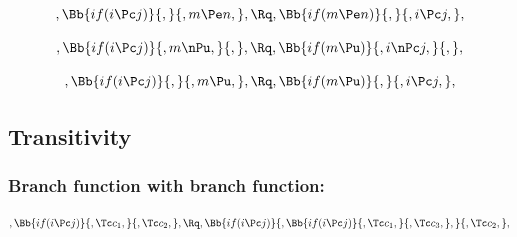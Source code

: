 \bigskip
\bigskip
\[, \Bb{if(i \Pc j)}{,}{,m \Pe n,}, \Rq , \Bb{if(m \Pe n)}{,}{,i \Pc j,},\]

\bigskip
\bigskip
\[, \Bb{if(i \Pc j)}{,m \nPu,}{,}, \Rq , \Bb{if(m \Pu)}{,i \nPc j,}{,},\]

\bigskip
\bigskip
\[, \Bb{if(i \Pc j)}{,}{,m \Pu,}, \Rq , \Bb{if(m \Pu)}{,}{,i \Pc j,},\]









\bigskip
\bigskip
\bigskip
\bigskip
\subsection{Transitivity}
\subsubsection{Branch function with branch function:}
\[, \Bb{if(i \Pc j)}{,\Tc c_1,}{,\Tc c_2,}, \Rq , \Bb{if(i \Pc j)}{,\Bb{if(i \Pc j)}{,\Tc c_1,}{,\Tc c_3,},}{,\Tc c_2,},\]


